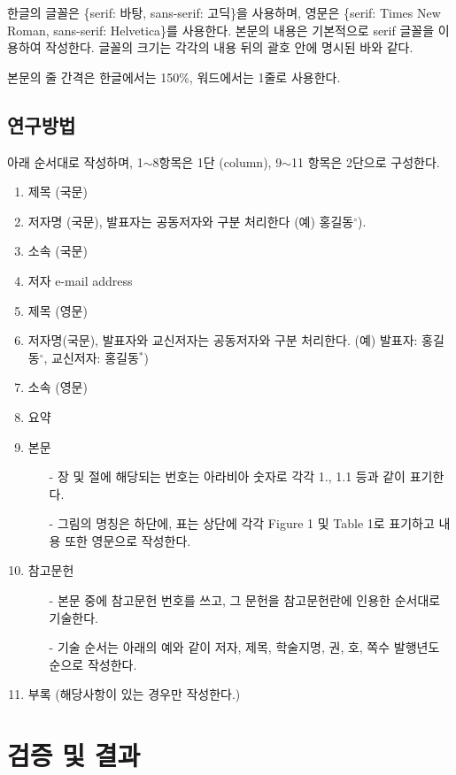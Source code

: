 \documentclass[a4paper,twocolumn]{article}
\begin{document}
한글의 글꼴은 \{serif: 바탕, sans-serif: 고딕\}을 사용하며, 
영문은 \{serif: Times New Roman, sans-serif: Helvetica\}를 사용한다. 
본문의 내용은 기본적으로 serif 글꼴을 이용하여 작성한다.
글꼴의 크기는 각각의 내용 뒤의 괄호 안에 명시된 바와 같다.

본문의 줄 간격은 한글에서는 150\%, 워드에서는 1줄로 사용한다.


\subsection{연구방법}
\label{subsec:s}

아래 순서대로 작성하며, 1$\sim$8항목은 1단 (column), 
9$\sim$11 항목은 2단으로 구성한다.

\begin{enumerate}
	\item 제목 (국문)
	\item 저자명 (국문), 발표자는 공동저자와 구분 처리한다 (예) 홍길동$^{\circ}$).
	\item 소속 (국문)
	\item 저자 e-mail address
	\item 제목 (영문)
	\item 저자명(국문), 발표자와 교신저자는 공동저자와 구분 처리한다. (예) 발표자: 홍길동$^{\circ}$, 교신저자: 홍길동$^{*}$)
	\item 소속 (영문)
	\item 요약
	\item 본문
	\begin{itemize}
		\item[-] 장 및 절에 해당되는 번호는 아라비아 숫자로 각각 1., 1.1 등과 같이 표기한다.
		\item[-] 그림의 명칭은 하단에, 표는 상단에 각각 Figure 1 및 Table 1로 표기하고 내용 또한 영문으로 작성한다.
	\end{itemize}
	\item 참고문헌
	\begin{itemize}
		\item[-] 본문 중에 참고문헌 번호를 쓰고, 그 문헌을 참고문헌란에 인용한 순서대로 기술한다.
		\item[-] 기술 순서는 아래의 예와 같이 저자, 제목, 학술지명, 권, 호, 쪽수 발행년도 순으로 작성한다.
	\end{itemize}
	\item 부록 (해당사항이 있는 경우만 작성한다.)
\end{enumerate}


\section{검증 및 결과}
\label{sec:results}
\end{document}
